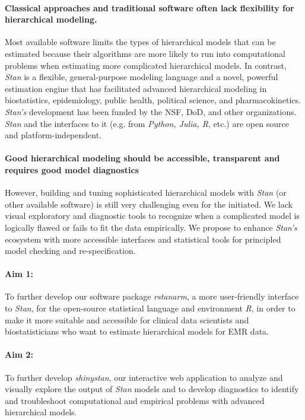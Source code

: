 \documentclass[11pt,notitlepage]{article}
\begin{document}
\paragraph*{Classical approaches and traditional software often lack flexibility 
for hierarchical modeling.} Most available software limits the types of 
hierarchical models that can be estimated because their algorithms are more likely 
to run into computational problems when estimating more complicated hierarchical models.
In contrast, \textit{Stan} is a flexible, general-purpose modeling language and a 
novel, powerful estimation engine that has facilitated advanced hierarchical modeling in biostatistics, epidemiology, public health, 
political science, and pharmacokinetics. \textit{Stan's} development has been funded by the NSF, DoD, and other organizations. 
\textit{Stan} and the interfaces to it (e.g. from \textit{Python, Julia, R}, etc.) are open source and platform-independent.

\paragraph*{Good hierarchical modeling should be accessible, transparent and requires good model diagnostics} 
However, building and tuning sophisticated hierarchical models with \textit{Stan} (or other available software) 
is still very challenging even for the initiated. We lack visual exploratory and diagnostic tools 
to recognize when a complicated model is logically  flawed or fails to fit the data empirically. We propose to enhance \textit{Stan's} 
ecosystem with more accessible interfaces and statistical tools for principled model checking and re-specification.

\paragraph*{Aim 1:} To further develop our software package \textit{rstanarm}, a more user-friendly interface to \textit{Stan}, 
for the open-source statistical language and environment \textit{R}, in order to make it more suitable and accessible for clinical data 
scientists and biostatisticians who want to estimate hierarchical models for EMR data.

\paragraph*{Aim 2:} To further develop \textit{shinystan}, our interactive web application to 
analyze and visually explore the output of \textit{Stan} models and to develop diagnostics 
to identify and troubleshoot computational and empirical problems with advanced hierarchical models.
\end{document}
